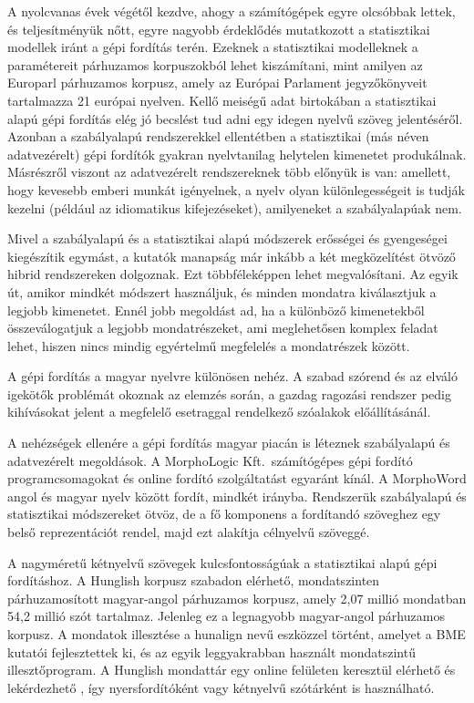 \begin{multicols}{2}
  A nyolcvanas évek végétől kezdve, ahogy a számítógépek egyre olcsóbbak lettek, és teljesítményük nőtt, egyre nagyobb érdeklődés mutatkozott a statisztikai modellek iránt a gépi fordítás terén. Ezeknek a statisztikai modelleknek a paramétereit párhuzamos korpuszokból lehet kiszámítani, mint amilyen az Europarl pár\-hu\-za\-mos korpusz, amely az Európai Parlament jegyzőkönyveit tartalmazza 21 európai nyelven. Kellő meiségű adat birtokában a statisztikai alapú gépi fordítás elég jó becslést tud adni egy idegen nyelvű szöveg jelentéséről. Azonban a szabályalapú rendszerekkel ellentétben a statisztikai (más néven adatvezérelt) gépi fordítók gyakran nyelvtanilag helytelen kimenetet produkálnak. Másrészről vi\-szont az adatvezérelt rendszereknek több előnyük is van: amellett, hogy kevesebb emberi munkát igényelnek, a nyelv olyan különlegességeit is tudják kezelni (például az idiomatikus kifejezéseket), amilyeneket a szabályalapúak nem. 

  Mivel a szabályalapú és a statisztikai alapú módszerek erősségei és gyengeségei kiegészítik egymást, a kutatók manapság már inkább a két megközelítést ötvöző hib\-rid rendszereken dolgoznak. Ezt több\-fé\-le\-kép\-pen lehet megvalósítani. Az egyik út, amikor mindkét módszert használjuk, és minden mondatra kiválasztjuk a legjobb kimenetet. Ennél jobb megoldást ad, ha a különböző kimenetekből összeválogatjuk a legjobb mondatrészeket, ami meglehetősen komplex feladat lehet, hiszen nincs mindig egyértelmű megfelelés a mondatrészek között.  


  A gépi fordítás a magyar nyelvre különösen nehéz. A szabad szórend és az elváló igekötők problémát okoznak az elemzés során, a gazdag ragozási rendszer pedig kihívásokat jelent a megfelelő esetraggal rendelkező szóalakok előállításánál.

  A nehézségek ellenére a gépi fordítás ma\-gyar piacán is léteznek szabályalapú és adatvezérelt megoldások. A MorphoLogic Kft.\ számítógépes gépi fordító prog\-ram\-cso\-ma\-go\-kat és online fordító szolgáltatást egyaránt kínál. A MorphoWord angol és magyar nyelv között fordít, mindkét irányba. Rendszerük szabályalapú és statisztikai módszereket ötvöz, de a fő komponens a fordítandó szöveghez egy belső reprezentációt rendel, majd ezt alakítja célnyelvű szöveggé. 

  A nagyméretű kétnyelvű szövegek kulcsfontosságúak a statisztikai alapú gépi fordításhoz. A Hunglish korpusz szabadon elérhető, mondatszinten párhuzamosított magyar-angol párhuzamos korpusz, amely 2,07 millió mondatban 54,2 millió szót tartalmaz. Jelenleg ez a legnagyobb magyar-angol párhuzamos korpusz. A mondatok illesztése a hunalign nevű esz\-köz\-zel történt, amelyet a BME kutatói fej\-lesz\-tet\-tek ki, és az egyik leggyakrabban használt mondatszintű il\-lesz\-tő\-prog\-ram. A Hunglish mondattár egy online felületen keresztül elérhető és lekérdezhető \cite{hunglish}, így nyersfordítóként vagy kétnyelvű szótárként is használható.


\end{multicols}
